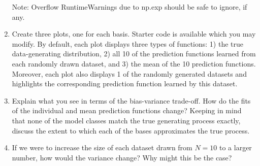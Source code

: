 \documentclass[submit]{harvardml}
\begin{document}
\begin{problem}
\begin{enumerate}
   Note: Overflow RuntimeWarnings due to np.exp should be safe to ignore, if any.

\item Create three plots, one for each basis. Starter code is available which you may modify.
By default, each plot displays three types of functions:
1) the true data-generating distribution,
2) all 10 of the prediction functions learned from each randomly drawn dataset, and
3) the mean of the 10 prediction functions.
Moreover, each plot also displays 1 of the randomly generated datasets and highlights the corresponding prediction function learned by this dataset.

\item Explain what you see in terms of the bias-variance trade-off.
How do the fits of the individual and mean prediction functions change?
Keeping in mind that none of the model classes match the true generating process exactly, discuss the extent to which each of the bases approximates the true process.

\item If we were to increase the size of each dataset drawn from $N = 10$ to a larger number, how would the variance change? Why might this be the case?

\end{enumerate}

\end{problem}

\newpage
\end{document}
